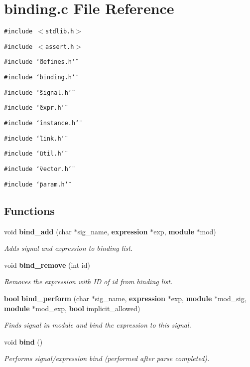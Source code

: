 \section{binding.c File Reference}
\label{binding_8c}
{\tt \#include $<$stdlib.h$>$}\par
{\tt \#include $<$assert.h$>$}\par
{\tt \#include \char`\"{}defines.h\char`\"{}}\par
{\tt \#include \char`\"{}binding.h\char`\"{}}\par
{\tt \#include \char`\"{}signal.h\char`\"{}}\par
{\tt \#include \char`\"{}expr.h\char`\"{}}\par
{\tt \#include \char`\"{}instance.h\char`\"{}}\par
{\tt \#include \char`\"{}link.h\char`\"{}}\par
{\tt \#include \char`\"{}util.h\char`\"{}}\par
{\tt \#include \char`\"{}vector.h\char`\"{}}\par
{\tt \#include \char`\"{}param.h\char`\"{}}\par
\subsection*{Functions}
\begin{CompactItemize}
\item 
void {\bf bind\_\-add} (char $\ast$sig\_\-name, {\bf expression} $\ast$exp, {\bf module} $\ast$mod)
\begin{CompactList}\small\item\em Adds signal and expression to binding list. \item\end{CompactList}\item 
void {\bf bind\_\-remove} (int id)
\begin{CompactList}\small\item\em Removes the expression with ID of id from binding list. \item\end{CompactList}\item 
{\bf bool} {\bf bind\_\-perform} (char $\ast$sig\_\-name, {\bf expression} $\ast$exp, {\bf module} $\ast$mod\_\-sig, {\bf module} $\ast$mod\_\-exp, {\bf bool} implicit\_\-allowed)
\begin{CompactList}\small\item\em Finds signal in module and bind the expression to this signal. \item\end{CompactList}\item 
void {\bf bind} ()
\begin{CompactList}\small\item\em Performs signal/expression bind (performed after parse completed). \item\end{CompactList}\end{CompactItemize}
